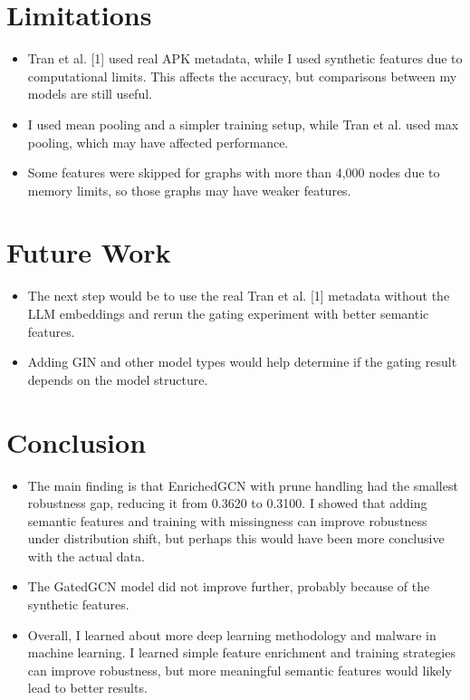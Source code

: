 \documentclass[12pt]{article}
\begin{document}
\section{Limitations}

\begin{itemize}
    \item Tran et al. [1] used real APK metadata, while I used synthetic features due to computational limits. This affects the accuracy, but comparisons between my models are still useful.
    \item I used mean pooling and a simpler training setup, while Tran et al. used max pooling, which may have affected performance. 
    \item Some features were skipped for graphs with more than 4,000 nodes due to memory limits, so those graphs may have weaker features.
\end{itemize}

\section{Future Work}

\begin{itemize}
    \item The next step would be to use the real Tran et al. [1] metadata without the LLM embeddings and rerun the gating experiment with better semantic features.
    \item Adding GIN and other model types would help determine if the gating result depends on the model structure.
\end{itemize}

\section{Conclusion}

\begin{itemize}
    \item The main finding is that EnrichedGCN with prune handling had the smallest robustness gap, reducing it from 0.3620 to 0.3100. I showed that adding semantic features and training with missingness can improve robustness under distribution shift, but perhaps this would have been more conclusive with the actual data. 
    
    \item The GatedGCN model did not improve further, probably because of the synthetic features.
    
    \item Overall, I learned about more deep learning methodology and malware in machine learning. I learned simple feature enrichment and training strategies can improve robustness, but more meaningful semantic features would likely lead to better results.
\end{itemize}
\end{document}
